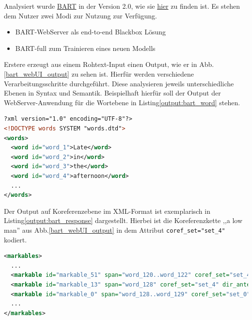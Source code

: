 Analysiert wurde \href{http://www.bart-anaphora.org/}{BART} in der Version 2.0, 
wie sie \href{http://www.bart-anaphora.org/release/bart-2.0.tar.gz}{hier} zu finden 
ist.
Es stehen dem Nutzer zwei Modi zur Nutzung zur Verfügung.
\begin{itemize}
\item BART-WebServer als end-to-end Blackbox Lösung
\item BART-full zum Trainieren eines neuen Modells
\end{itemize}
Erstere erzeugt aus einem Rohtext-Input einen Output, 
wie er in Abb.\ref{bart_webUI_output} zu sehen ist.
Hierfür werden verschiedene Verarbeitungsschritte durchgeführt. 
Diese analysieren jeweils unterschiedliche Ebenen in Syntax und Semantik. 
Beispielhaft hierfür soll der Output der WebServer-Anwendung für die Wortebene in 
Listing\ref{output:bart_word} stehen.

\begin{lstlisting}[label=output:bart_word, name=words.xml, language=xml, caption=BART-Output der Wortebene]
?xml version="1.0" encoding="UTF-8"?>
<!DOCTYPE words SYSTEM "words.dtd">
<words>
  <word id="word_1">Late</word>
  <word id="word_2">in</word>
  <word id="word_3">the</word>
  <word id="word_4">afternoon</word>
  ...
</words>
\end{lstlisting}
Der Output auf Koreferenzebene im XML-Format ist exemplarisch in 
Listing\ref{output:bart_response} dargestellt.
Hierbei ist die Koreferenzkette ,,a low man'' aus Abb.\ref{bart_webUI_output} in dem 
Attribut \lstinline[language=XML]{coref_set="set_4"} kodiert.

\begin{lstlisting}[label=output:bart_response, name=XXX_response_level.xml, language=xml, caption=BART-Output der Koreferenzebene]
<markables>
  ...
  <markable id="markable_51" span="word_120..word_122" coref_set="set_4" min_ids="word_120..word_122" mmax_level="response"/>
  <markable id="markable_13" span="word_128" coref_set="set_4" dir_antecedent="markable_51" mmax_level="response"/>
  <markable id="markable_0" span="word_128..word_129" coref_set="set_0" min_ids="word_128..word_129" mmax_level="response"/>
  ...
</markables>
\end{lstlisting}

